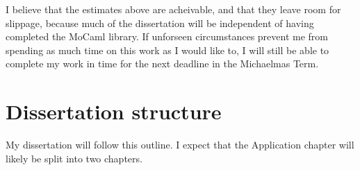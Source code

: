 \documentclass[proposal]{softeng}
\begin{document}
I believe that the estimates above are acheivable, and that they leave
room for slippage, because much of the dissertation will be
independent of having completed the MoCaml library. If unforseen
circumstances prevent me from spending as much time on this work as I
would like to, I will still be able to complete my work in time for
the next deadline in the Michaelmas Term.

\section{Dissertation structure}


My dissertation will follow this outline. I expect that the
Application chapter will likely be split into two chapters.
\end{document}
